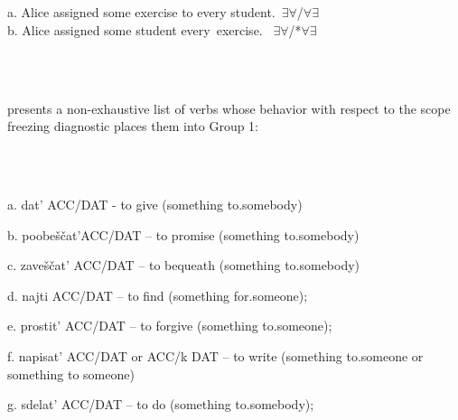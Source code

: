 \documentclass[output=paper,modfonts, nonflat]{langsci/langscibook}
\begin{document}
\begin{styleinnerExample}
\ea%
    \label{ex:key:13}
    \gll\\
        \\
    \glt
    \z

           a.  Alice assigned some exercise to every student.~${\exists}{\forall}$/${\forall}{\exists}$\\
b.  Alice assigned some student every~exercise.~ ${\exists}{\forall}$/*${\forall}{\exists}$
\end{styleinnerExample}

\ea%
    \label{ex:key:14}
    \gll\\
        \\
    \glt
    \z

         presents a non-exhaustive list of verbs whose behavior with respect to the scope freezing diagnostic places them into Group 1:

\begin{styleinnerExample}
\ea%
    \label{ex:key:14}
    \gll\\
        \\
    \glt
    \z

           a.   dat’ ACC/DAT  {}- to give (something to.somebody)
\end{styleinnerExample}

\begin{styleinnerExample}
  b.   poobeščat’ACC/DAT – to promise (something to.somebody)
\end{styleinnerExample}

\begin{styleinnerExample}
  c.  zaveščat’ ACC/DAT – to bequeath (something to.somebody)
\end{styleinnerExample}

\begin{styleinnerExample}
  d.  najti ACC/DAT – to find (something for.someone);
\end{styleinnerExample}

\begin{styleinnerExample}
  e.   prostit’ ACC/DAT – to forgive (something to.someone);
\end{styleinnerExample}

\begin{styleinnerExample}
  f.   napisat’ ACC/DAT or ACC/k DAT – to write (something to.someone or something to someone)
\end{styleinnerExample}

\begin{styleinnerExample}
  g.   sdelat’ ACC/DAT – to do (something to.somebody);
\end{styleinnerExample}
\end{document}

